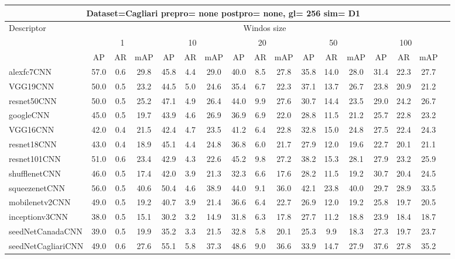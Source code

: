 \documentclass[12pt,italian]{article}
\begin{document}
 \pagebreak 
\begin{longtable}{lcccccccccccccccc}
\toprule
\multicolumn{16}{c}{Dataset=Cagliari prepro= none postpro= none, gl= 256 sim= D1} \\ 
\toprule
Descriptor & \multicolumn{15}{c}{Windos size} \\ 
& \multicolumn{3}{c}{1} & \multicolumn{3}{c}{10} & \multicolumn{3}{c}{20} & \multicolumn{3}{c}{50} & \multicolumn{3}{c}{100} \\ 
& AP & AR & mAP & AP & AR & mAP & AP & AR & mAP & AP & AR & mAP & AP & AR & mAP \\ 
\midrule
alexfc7CNN & 57.0 &  0.6 & 29.8 & 45.8 &  4.4 & 29.0 & 40.0 &  8.5 & 27.8 & 35.8 & 14.0 & 28.0 & 31.4 & 22.3 & 27.7 \\ 
VGG19CNN & 50.0 &  0.5 & 23.2 & 44.5 &  5.0 & 24.6 & 35.4 &  6.7 & 22.3 & 37.1 & 13.7 & 26.7 & 23.8 & 20.9 & 21.2 \\ 
resnet50CNN & 50.0 &  0.5 & 25.2 & 47.1 &  4.9 & 26.4 & 44.0 &  9.9 & 27.6 & 30.7 & 14.4 & 23.5 & 29.0 & 24.2 & 26.7 \\ 
googleCNN & 45.0 &  0.5 & 19.7 & 43.9 &  4.6 & 26.9 & 36.9 &  6.9 & 22.0 & 28.8 & 11.5 & 21.2 & 25.7 & 22.8 & 23.2 \\ 
VGG16CNN & 42.0 &  0.4 & 21.5 & 42.4 &  4.7 & 23.5 & 41.2 &  6.4 & 22.8 & 32.8 & 15.0 & 24.8 & 27.5 & 22.4 & 24.3 \\ 
resnet18CNN & 43.0 &  0.4 & 18.9 & 45.1 &  4.4 & 24.8 & 36.8 &  6.0 & 21.7 & 27.9 & 12.0 & 19.6 & 22.7 & 20.1 & 21.1 \\ 
resnet101CNN & 51.0 &  0.6 & 23.4 & 42.9 &  4.3 & 22.6 & 45.2 &  9.8 & 27.2 & 38.2 & 15.3 & 28.1 & 27.9 & 23.2 & 25.9 \\ 
shufflenetCNN & 46.0 &  0.5 & 17.4 & 42.0 &  3.9 & 21.3 & 32.3 &  6.6 & 17.6 & 28.2 & 11.5 & 19.2 & 30.7 & 20.4 & 24.5 \\ 
squeezenetCNN & 56.0 &  0.5 & 40.6 & 50.4 &  4.6 & 38.9 & 44.0 &  9.1 & 36.0 & 42.1 & 23.8 & 40.0 & 29.7 & 28.9 & 33.5 \\ 
mobilenetv2CNN & 49.0 &  0.5 & 19.2 & 40.7 &  3.9 & 21.4 & 36.6 &  6.4 & 22.7 & 26.9 & 12.0 & 19.2 & 25.8 & 19.7 & 20.5 \\ 
inceptionv3CNN & 38.0 &  0.5 & 15.1 & 30.2 &  3.2 & 14.9 & 31.8 &  6.3 & 17.8 & 27.7 & 11.2 & 18.8 & 23.9 & 18.4 & 18.7 \\ 
seedNetCanadaCNN & 39.0 &  0.5 & 19.9 & 35.2 &  3.3 & 21.5 & 32.8 &  5.8 & 20.1 & 25.3 &  9.9 & 18.3 & 27.3 & 19.7 & 23.7 \\ 
seedNetCagliariCNN & 49.0 &  0.6 & 27.6 & 55.1 &  5.8 & 37.3 & 48.6 &  9.0 & 36.6 & 33.9 & 14.7 & 27.9 & 37.6 & 27.8 & 35.2 \\ 
\bottomrule
\end{longtable} 

 \pagebreak 
\end{document}

